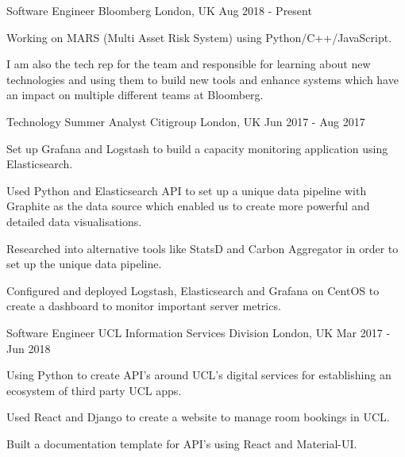 

\begin{cventries}

\cventry
  {Software Engineer}
  {Bloomberg}
  {London, UK}
  {Aug 2018 - Present}
  {
  \begin{cvitems}
    \item {Working on MARS (Multi Asset Risk System) using Python/C++/JavaScript.}
    \item {I am also the tech rep for the team and responsible for learning about new technologies
      and using them to build new tools and enhance systems which have an impact on multiple different
      teams at Bloomberg.}
  \end{cvitems}
  }

\cventry
  {Technology Summer Analyst}
  {Citigroup}
  {London, UK}
  {Jun 2017 - Aug 2017}
  {
  \begin{cvitems}
    \item {Set up Grafana and Logstash to build a capacity monitoring application
      using Elasticsearch.}
    \item {Used Python and Elasticsearch API to set up a unique data pipeline
      with Graphite as the data source which enabled us to create more powerful
      and detailed data visualisations.}
    \item {Researched into alternative tools like StatsD and Carbon Aggregator
      in order to set up the unique data pipeline.}
    \item {Configured and deployed Logstash, Elasticsearch and Grafana on CentOS to create
      a dashboard to monitor important server metrics.}
  \end{cvitems}
  }


\cventry
  {Software Engineer}
  {UCL Information Services Division}
  {London, UK}
  {Mar 2017 - Jun 2018}
  {
  \begin{cvitems}
    \item {Using Python to create API's around UCL's digital services for establishing an ecosystem of third party UCL apps.}
    \item {Used React and Django to create a website to manage room bookings in UCL.}
    \item {Built a documentation template for API's using React and Material-UI.}
  \end{cvitems}
  }



\end{cventries}

